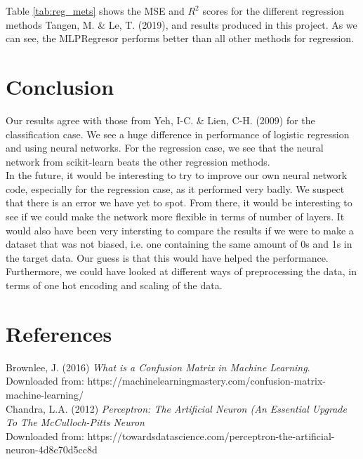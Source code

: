 \documentclass[11pt,english, A4]{article}
\begin{document}
Table \ref{tab:reg_mets} shows the MSE and $R^{2}$ scores for the different regression methods Tangen, M. \& Le, T. (2019), and results produced in this project. As we can see, the MLPRegresor performs better than all other methods for regression. 


\section{Conclusion}

Our results agree with those from Yeh, I-C. \& Lien, C-H. (2009) for the classification case. We see a huge difference in performance of logistic regression and using neural networks. For the regression case, we see that the neural network from scikit-learn beats the other regression methods. \\

In the future, it would be interesting to try to improve our own neural network code, especially for the regression case, as it performed very badly. We suspect that there is an error we have yet to spot. From there, it would be interesting to see if we could make the network more flexible in terms of number of layers. It would also have been very intersting to compare the results if we were to make a dataset that was not biased, i.e. one containing the same amount of 0s and 1s in the target data. Our guess is that this would have helped the performance. Furthermore, we could have looked at different ways of preprocessing the data, in terms of one hot encoding and scaling of the data.

\newpage 
\section{References}

Brownlee, J. (2016) \textit{What is a Confusion Matrix in Machine Learning}.\\
Downloaded from: https://machinelearningmastery.com/confusion-matrix-machine-learning/\\

Chandra, L.A. (2012) \textit{Perceptron: The Artificial Neuron (An Essential Upgrade To The McCulloch-Pitts Neuron}\\
Downloaded from: https://towardsdatascience.com/perceptron-the-artificial-neuron-4d8c70d5cc8d\\
\end{document}
